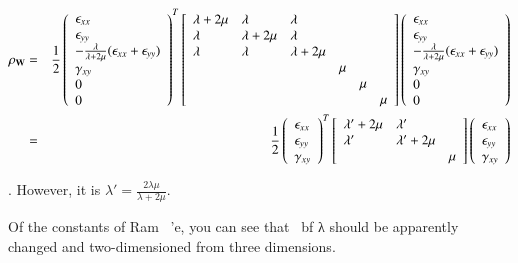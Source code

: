 \begin{eqnarray}
\rho_{\mathbf{W}}
&=& \frac{1}{2}\left(\begin{array}{l}
\epsilon_{xx}\\
\epsilon_{yy}\\
-\frac{\lambda}{\lambda+2\mu}(\epsilon_{xx}+\epsilon_{yy})\\
\gamma_{xy}\\
0\\
0\end{array}\right)^T
\left[\begin{array}{llllll}
\lambda+2\mu & \lambda & \lambda\\
\lambda & \lambda+2\mu & \lambda\\
\lambda & \lambda & \lambda+2\mu\\
& & & \mu&   & \\
& & &    &\mu& \\
& & &    &   &\mu
\end{array}\right]
\left(\begin{array}{l}
\epsilon_{xx}\\
\epsilon_{yy}\\
-\frac{\lambda}{\lambda+2\mu}(\epsilon_{xx}+\epsilon_{yy})\\
\gamma_{xy}\\
0\\
0
\end{array}\right)\\
&=& \frac{1}{2}\left(\begin{array}{l}
\epsilon_{xx}\\
\epsilon_{yy}\\
\gamma_{xy}
\end{array}\right)^T
\left[\begin{array}{lll}
\lambda'+2\mu & \lambda' & \\
\lambda' & \lambda'+2\mu & \\
& & \mu\\
\end{array}\right]
\left(\begin{array}{l}
\epsilon_{xx}\\
\epsilon_{yy}\\
\gamma_{xy}
\end{array}\right)
\end{eqnarray}


.
However, it is $\lambda'=\frac{2\lambda\mu}{\lambda+2\mu}$.

Of the constants of Ram \ 'e, you can see that {\ bf λ should be apparently changed and two-dimensioned from three dimensions}.


